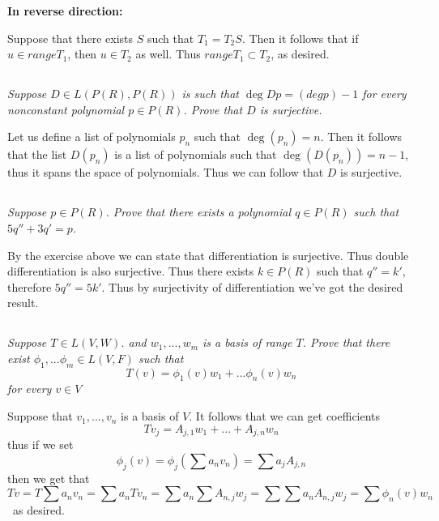 \documentclass[11pt,oneside,titlepage]{book}
\begin{document}
\textbf{In reverse direction: }

Suppose that there exists $S$ such that $T_1 = T_2 S$. Then it follows that if $u \in range T_1$,
then $u \in T_2$ as well. Thus $range T_1 \subset T_2$, as desired.


\subsection{}

\textit{Suppose $D \in L(P(R), P(R))$ is such that $\deg Dp = (deg p) -1$ for every nonconstant
  polynomial $p \in P(R)$. Prove that $D$ is surjective.}

Let us define a list of polynomials $p_n$ such that $\deg(p_n) = n$. Then it follows that
the list $D(p_n)$ is a list of polynomials such that $\deg (D(p_n)) = n - 1$, thus it
spans the space of polynomials. Thus we can follow that $D$ is surjective.

\subsection{}
\textit{Suppose $p \in P(R)$. Prove that there exists a polynomial $q \in P(R)$ such that
  $5q'' + 3q' = p$.}

By the exercise above we can state that differentiation is surjective. Thus double differentiation
is also surjective. Thus there exists $k \in P(R)$ such that $q'' = k'$, therefore
$5q'' = 5k'$. Thus by surjectivity of differentiation we've got the desired result.

\subsection{}
\textit{Suppose $T \in L(V, W)$. and $w_1, ..., w_m$ is a basis of range $T$. Prove that there
  exist $\phi_1, ... \phi_m \in L(V, F)$ such that }
$$T(v) = \phi_1(v) w_1 + ... \phi_n(v) w_n$$
\textit{for every $v \in V$}

Suppose that $v_1, ..., v_n$ is a basis of $V$. It follows that we can get coefficients
$$T v_j = A_{j,1} w_1 + ... + A_{j,n} w_n$$
thus if we set
$$\phi_j(v) = \phi_j(\sum a_n v_n) = \sum a_j A_{j, n}$$
then we get that
$$T v = T \sum a_n v_n = \sum a_n T v_n = \sum {a_n \sum A_{n, j} w_j} =
\sum {\sum a_n A_{n, j} w_j} = \sum {\phi_n(v) w_n} $$\
as desired.

\subsection{}
\end{document}
